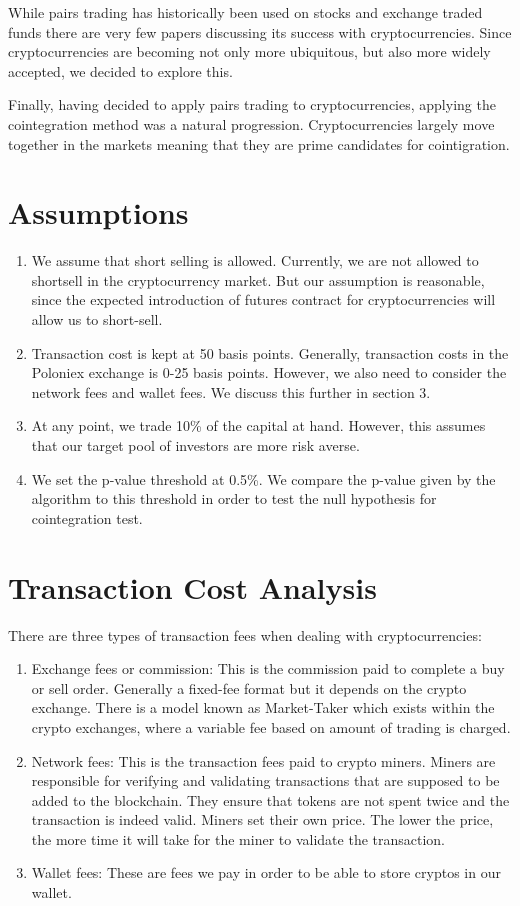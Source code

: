 \documentclass[12pt, letterpaper]{article}
\begin{document}
While pairs trading has historically been used on stocks and exchange traded funds there are very few papers discussing its success with cryptocurrencies. Since cryptocurrencies are becoming not only more ubiquitous, but also more widely accepted, we decided to explore this.

Finally, having decided to apply pairs trading to cryptocurrencies, applying the cointegration method was a natural progression. Cryptocurrencies largely move together in the markets meaning that they are prime candidates for cointigration.

\section{Assumptions}
\begin{enumerate}
	\item We assume that short selling is allowed. Currently, we are not allowed to shortsell in the cryptocurrency market. But our assumption is reasonable, since the expected introduction of futures contract for cryptocurrencies will allow us to short-sell. 
	\item Transaction cost is kept at 50 basis points. Generally, transaction costs in the Poloniex exchange is 0-25 basis points. However, we also need to consider the network fees and wallet fees. We discuss this further in section 3.
	\item At any point, we trade 10\% of the capital at hand. However, this assumes that our target pool of investors are more risk averse. 
	\item We set the p-value threshold at 0.5\%. We compare the p-value given by the algorithm to this threshold in order to test the null hypothesis for cointegration test.
\end{enumerate}

\section{Transaction Cost Analysis}
There are three types of transaction fees when dealing with cryptocurrencies:

\begin{enumerate}
	\item Exchange fees or commission: This is the commission paid to complete a buy or sell order. Generally a fixed-fee format but it depends on the crypto exchange. There is a model known as Market-Taker which exists within the crypto exchanges, where a variable fee based on amount of trading is charged.
	\item Network fees: This is the transaction fees paid to crypto miners. Miners are responsible for verifying and validating transactions that are supposed to be added to the blockchain. They ensure that tokens are not spent twice and the transaction is indeed valid. Miners set their own price.  The lower the price, the more time it will take for the miner to validate the transaction.
	\item Wallet fees: These are fees we pay in order to be able to store cryptos in our wallet.
\end{enumerate}
\end{document}
